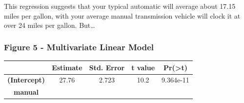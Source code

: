 \documentclass[]{article}
\begin{document}
This regression suggests that your typical automatic will average about
17.15 miles per gallon, with your average manual transmission vehicle
will clock it at over 24 miles per gallon. But\ldots{}

\subsubsection{Figure 5 - Multivariate Linear
Model}\label{figure-5---multivariate-linear-model}

\begin{longtable}[c]{@{}ccccc@{}}
\toprule
\begin{minipage}[b]{0.32\columnwidth}\centering\strut
~
\strut\end{minipage} &
\begin{minipage}[b]{0.13\columnwidth}\centering\strut
Estimate
\strut\end{minipage} &
\begin{minipage}[b]{0.16\columnwidth}\centering\strut
Std. Error
\strut\end{minipage} &
\begin{minipage}[b]{0.12\columnwidth}\centering\strut
t value
\strut\end{minipage} &
\begin{minipage}[b]{0.12\columnwidth}\centering\strut
Pr(\textgreater{}\textbar{}t\textbar{})
\strut\end{minipage}\tabularnewline
\midrule
\endhead
\begin{minipage}[t]{0.32\columnwidth}\centering\strut
\textbf{(Intercept)}
\strut\end{minipage} &
\begin{minipage}[t]{0.13\columnwidth}\centering\strut
27.76
\strut\end{minipage} &
\begin{minipage}[t]{0.16\columnwidth}\centering\strut
2.723
\strut\end{minipage} &
\begin{minipage}[t]{0.12\columnwidth}\centering\strut
10.2
\strut\end{minipage} &
\begin{minipage}[t]{0.12\columnwidth}\centering\strut
9.364e-11
\strut\end{minipage}\tabularnewline
\begin{minipage}[t]{0.32\columnwidth}\centering\strut
\textbf{manual}
\strut\end{minipage} &
\begin{minipage}[t]{0.13\columnwidth}\centering\strut

\end{minipage}
\end{longtable}
\end{document}
